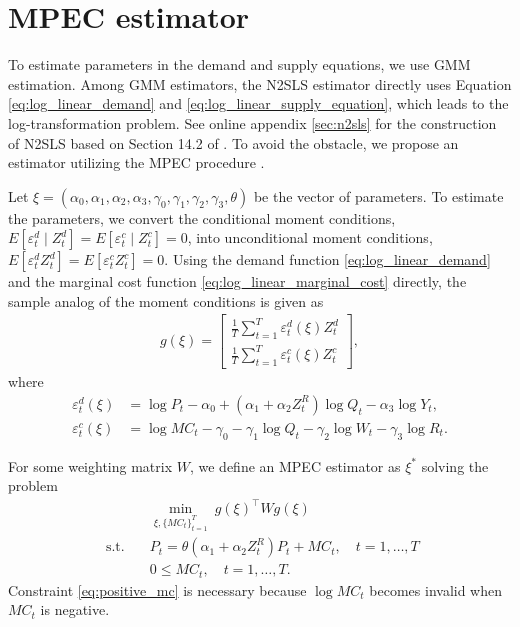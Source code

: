 \documentclass[11pt, a4paper]{article}
\begin{document}
\section{MPEC estimator}
To estimate parameters in the demand and supply equations, we use GMM estimation.
Among GMM estimators, the N2SLS estimator directly uses Equation \eqref{eq:log_linear_demand} and \eqref{eq:log_linear_supply_equation}, which leads to the log-transformation problem.
See online appendix \ref{sec:n2sls} for the construction of N2SLS based on Section 14.2 of \cite{wooldridge2010econometric}.
To avoid the obstacle, we propose an estimator utilizing the MPEC procedure \citep{su2012constrained,dube2012improving}.

Let $\xi = (\alpha_0,\alpha_1, \alpha_2, \alpha_3, \gamma_0,\gamma_1, \gamma_2, \gamma_3, \theta)$ be the vector of parameters.
To estimate the parameters, we convert the conditional moment conditions, $E[\varepsilon_t^d\mid Z_t^d] = E[\varepsilon_t^c\mid Z_t^c]=0$, into unconditional moment conditions, $E[\varepsilon_t^d Z_t^d] = E[\varepsilon_t^cZ_t^c]=0$.
Using the demand function \eqref{eq:log_linear_demand} and the marginal cost function \eqref{eq:log_linear_marginal_cost} directly, the sample analog of the moment conditions is given as
\begin{align*}
    g(\xi) = \left[\begin{array}{l}
    \frac{1}{T}\sum_{t=1}^T{\varepsilon}^{d}_{t}(\xi)Z_{t}^{d} \\
    \frac{1}{T}\sum_{t=1}^T{\varepsilon}^{c}_{t}(\xi)Z_{t}^{c}
    \end{array}\right],
\end{align*}
where
\begin{align}
    \varepsilon_t^d(\xi) & =  \log P_{t} - \alpha_0 + (\alpha_1 + \alpha_2 Z^{R}_{t}) \log Q_t - \alpha_3 \log Y_t, \label{eq:residual_demand_mpec}\\
    \varepsilon_t^c(\xi) & = \log MC_{t} - \gamma_0 - \gamma_1 \log Q_t -  \gamma_2 \log W_{t} - \gamma_3 \log R_t \label{eq:residual_supply_mpec}.
\end{align}

For some weighting matrix $W$, we define an MPEC estimator as $\xi^{*}$ solving the problem
\begin{align}
    &\min_{\xi, \{MC_t\}_{t=1}^T}\ g(\xi)^\top W g(\xi)\\
    \text{ s.t.}\quad & P_t = \theta (\alpha_1 + \alpha_2 Z^{R}_{t})P_t + MC_t,\quad t = 1,\ldots, T\\
    & 0 \le MC_t,\quad t = 1,\ldots, T\label{eq:positive_mc}.
\end{align}
Constraint \eqref{eq:positive_mc} is necessary because $\log MC_t$ becomes invalid when $MC_t$ is negative.
\end{document}
